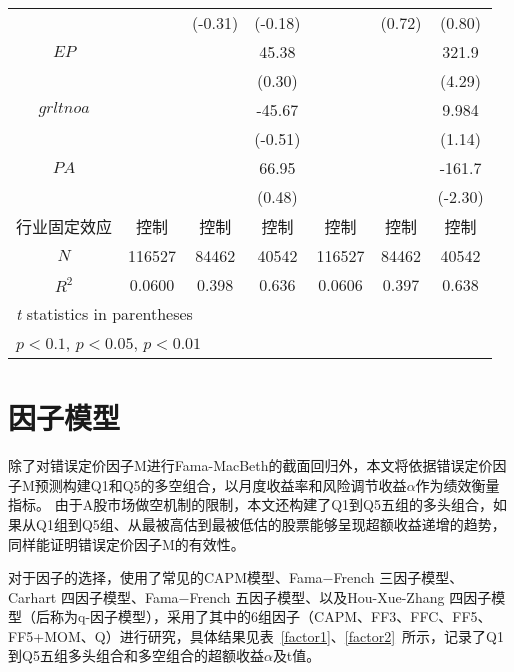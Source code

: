 \begin{table}[htbp]
\begin{tabular*}{\hsize}{@{\hskip\tabcolsep\extracolsep\fill}*{7}{c}}
          &                  &  (-0.31)         &  (-0.18)        &                  &   (0.72)         &   (0.80)        \\
$EP $       &                      &                  &    45.38       &                  &                  &    321.9\sym{***}    \\
          &                  &                  &   (0.30)       &                  &                  &   (4.29)          \\
$grltnoa$   &                 &                  &   -45.67      &                  &                  &    9.984      \\
          &                  &                  &  (-0.51)    &                  &                  &   (1.14)       \\
$PA   $     &                  &                  &    66.95           &                  &                  &   -161.7\sym{**}  \\
          &                  &                  &   (0.48)    &                  &                  &  (-2.30)             \\
行业固定效应&    控制   &    控制 &      控制 &    控制   &    控制 &      控制    \\
\midrule
$N$         &   116527         &    84462         &    40542      &   116527         &    84462         &    40542        \\
$R^2$       &   0.0600         &    0.398         &    0.636     &   0.0606         &    0.397         &    0.638              \\
\bottomrule
\multicolumn{4}{l}{\footnotesize \textit{t} statistics in parentheses}\\
\multicolumn{4}{l}{\footnotesize \sym{*} \(p<0.1\), \sym{**} \(p<0.05\), \sym{***} \(p<0.01\)}\\
\end{tabular*}
\end{table}

\section{因子模型}\label{sfactor}
除了对错误定价因子M进行Fama-MacBeth的截面回归外，本文将依据错误定价因子M预测构建Q1和Q5的多空组合，以月度收益率和风险调节收益$\alpha$作为绩效衡量指标。 由于A股市场做空机制的限制，本文还构建了Q1到Q5五组的多头组合，如果从Q1组到Q5组、从最被高估到最被低估的股票能够呈现超额收益递增的趋势，同样能证明错误定价因子M的有效性。

对于因子的选择，使用了常见的CAPM模型、Fama−French 三因子模型、 Carhart 四因子模型、Fama−French 五因子模型、以及Hou-Xue-Zhang 四因子模型（后称为q-因子模型），采用了其中的6组因子（CAPM、FF3、FFC、FF5、FF5+MOM、Q）进行研究，具体结果见表~\ref{factor1}、\ref{factor2}~所示，记录了Q1到Q5五组多头组合和多空组合的超额收益$\alpha$及t值。

